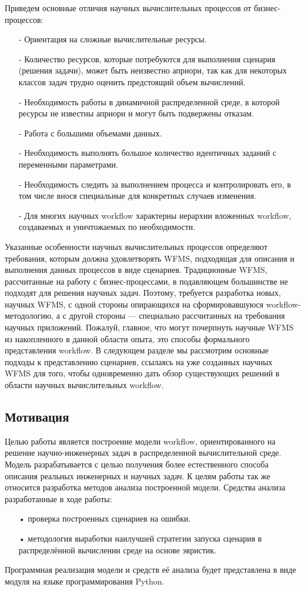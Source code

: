 \documentclass[a4paper,12pt]{article}
\begin{document}
Приведем основные отличия научных вычислительных процессов
от бизнес-процессов:
\begin{enumerate}
\item[-] Ориентация на сложные вычислительные ресурсы.
\item[-] Количество ресурсов, которые потребуются для выполнения сценария (решения задачи), может быть неизвестно априори, так как
для некоторых классов задач трудно оценить предстоящий объем
вычислений.
\item[-] Необходимость работы в динамичной распределенной среде, в которой ресурсы не известны априори и могут быть подвержены отказам.
\item[-] Работа с большими объемами данных.
\item[-] Необходимость выполнять большое количество идентичных заданий
с переменными параметрами.
\item[-] Необходимость следить за выполнением процесса и контролировать
его, в том числе внося специальные для конкретных случаев изменения.
\item[-]  Для многих научных workflow характерны иерархии вложенных workflow, создаваемых и уничтожаемых по необходимости.
\end{enumerate}

Указанные особенности научных вычислительных процессов определяют требования, которым должна удовлетворять WFMS, подходящая для
описания и выполнения данных процессов в виде сценариев. Традиционные WFMS, рассчитанные на работу с бизнес-процессами, в подавляющем большинстве не подходят для решения научных задач. Поэтому, требуется разработка новых, научных WFMS, с одной стороны опирающихся на сформировавшуюся workflow-методологию, а с другой стороны — специально рассчитанных на требования научных приложений.
Пожалуй, главное, что могут почерпнуть научные WFMS из накопленного в данной области опыта, это способы формального представления workflow. В следующем разделе мы рассмотрим основные подходы
к представлению сценариев, ссылаясь на уже созданных научных WFMS для того, чтобы одновременно дать обзор существующих
решений в области научных вычислительных workflow.


\subsection*{Мотивация}
Целью работы является построение модели workflow, ориентированного  на решение научно-инженерных задач в распределенной вычислительной среде.
Модель разрабатывается с целью получения более естественного способа
описания реальных инженерных и научных задач. 
К целям работы так же относится разработка методов анализа построенной модели.
Средства анализа разработанные в ходе работы:
\begin{enumerate}
\item[•] проверка построенных сценариев на ошибки.
\item[•] методология выработки наилучшей стратегии запуска сценария в распределённой вычислении среде на основе эвристик.
\end{enumerate}
Программная реализация модели и средств её анализа будет представлена в виде модуля на языке программирования Python.
\end{document}
